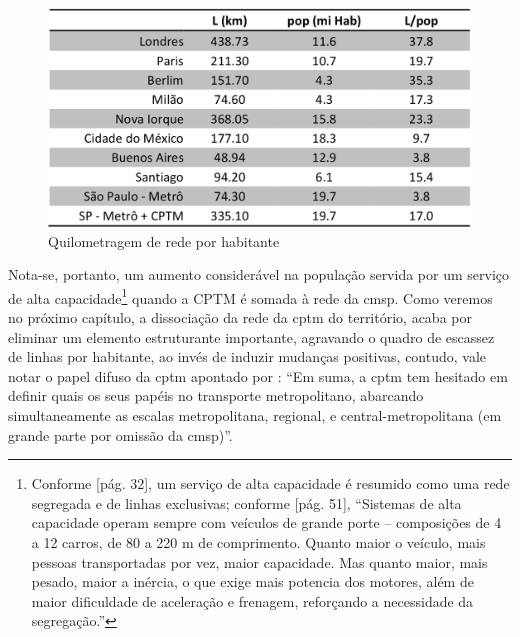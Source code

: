 	\begin{figure}[h]
		\caption{Quilometragem de rede por habitante 
		}
		\includegraphics[keepaspectratio,width=\textwidth]{img_isoda_km_rede.png}
	\end{figure}
	
	Nota-se, portanto, um aumento considerável na população servida por um serviço de alta capacidade\footnote{Conforme [pág. 32], um serviço de alta capacidade é resumido como uma rede segregada e de linhas exclusivas; conforme [pág. 51], ``Sistemas  de  alta  capacidade  operam  sempre  com  veículos  de  grande porte – composições de 4 a 12 carros, de 80 a 220 m de comprimento. Quanto  maior  o  veículo,  mais  pessoas  transportadas  por  vez,  maior capacidade.  Mas  quanto  maior,  mais  pesado,  maior  a  inércia,  o  que exige  mais  potencia  dos  motores,  além  de  maior  dificuldade  de aceleração e frenagem, reforçando a necessidade da segregação.''} quando a CPTM é somada à rede da \gls{cmsp}. Como veremos no próximo capítulo, a dissociação da rede da \gls{cptm} do território, acaba por eliminar um elemento estruturante importante, agravando o quadro de escassez de linhas por habitante, ao invés de induzir mudanças positivas, contudo, vale notar o papel difuso da \gls{cptm} apontado por : ``Em suma, a \gls{cptm} tem hesitado em definir quais os seus papéis no transporte metropolitano, abarcando simultaneamente as escalas metropolitana, regional, e central-metropolitana (em grande parte por omissão da \gls{cmsp})''. 
		
